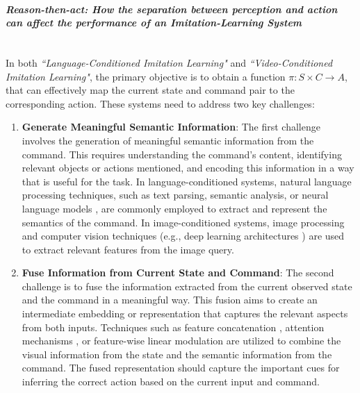 \paragraph{\textit{Reason-then-act: How the separation between perception and action can affect the performance of an Imitation-Learning System}} \mbox{} \\
In both \textit{``Language-Conditioned Imitation Learning"} and \textit{``Video-Conditioned Imitation Learning"}, the primary objective is to obtain a function $\pi: S \times C \rightarrow A $, that can effectively map the current state and command pair to the corresponding action. These systems need to address two key challenges:
\begin{enumerate}
    \item \textbf{Generate Meaningful Semantic Information}: The first challenge involves the generation of meaningful semantic information from the command. This requires understanding the command's content, identifying relevant objects or actions mentioned, and encoding this information in a way that is useful for the task. In language-conditioned systems, natural language processing techniques, such as text parsing, semantic analysis, or neural language models \cite{stepputtis2020language,jang2022bc_z,brohan2022rt}, are commonly employed to extract and represent the semantics of the command. In image-conditioned systems, image processing and computer vision techniques (e.g., deep learning architectures \cite{dasari2021transformers_one_shot,mandi2022towards_more_generalizable_one_shot}) are used to extract relevant features from the image query.
    \item \textbf{Fuse Information from Current State and Command}: The second challenge is to fuse the information extracted from the current observed state and the command in a meaningful way. This fusion aims to create an intermediate embedding or representation that captures the relevant aspects from both inputs. Techniques such as feature concatenation \cite{james2018task_embedded,stepputtis2020language,bhutani2022attentive_one_shot}, attention mechanisms \cite{dasari2021transformers_one_shot,mandi2022towards_more_generalizable_one_shot}, or feature-wise linear modulation \cite{brohan2022rt} are utilized to combine the visual information from the state and the semantic information from the command. The fused representation should capture the important cues for inferring the correct action based on the current input and command.
\end{enumerate}
